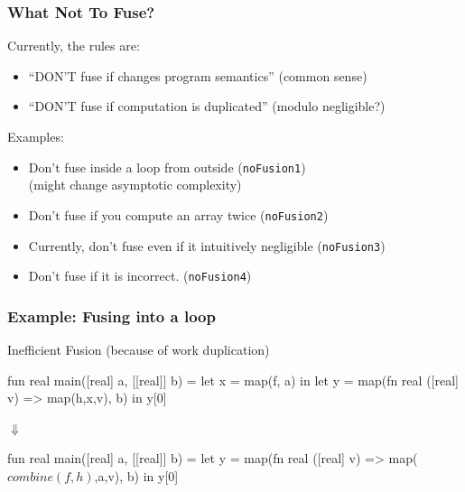 \documentclass{beamer}
\newcommand{\mymath}[1]{$ #1 $}
\begin{document}
\begin{frame}[fragile,t]
  \frametitle{What Not To Fuse?}

  Currently, the rules are:

  \begin{itemize}
  \item ``DON'T fuse if changes program semantics'' (common sense)
  \item ``DON'T fuse if computation is duplicated'' (modulo negligible?)
  \end{itemize}

  \bigskip

  Examples:
  \begin{itemize}
  \item Don't fuse inside a loop from outside (\texttt{noFusion1})\\
    (might change asymptotic complexity) \smallskip

  \item Don't fuse if you compute an array twice (\texttt{noFusion2})\smallskip

  \item Currently, don't fuse even if it intuitively negligible (\texttt{noFusion3})\smallskip

  \item Don't fuse if it is incorrect. (\texttt{noFusion4})
  \end{itemize}

\end{frame}

\begin{frame}[fragile,t]
  \frametitle{Example: Fusing into a loop}

  \begin{block}{Inefficient Fusion (because of work duplication)}
\begin{center}
      \begin{colorcode}[fontsize=\scriptsize]
fun real main([real] a, [[real]] b) =
let x      = map(f, a)                 in
let y      = map(fn real ([real] v) =>
                 map(h,x,v), b)        in
y[0]
      \end{colorcode}
$\Downarrow$
      \begin{colorcode}[fontsize=\scriptsize]
fun real main([real] a, [[real]] b) =
let y      = map(fn real ([real] v) =>
                 map(\mymath{combine(f,h)},a,v), b) in
y[0]
      \end{colorcode}
\end{center}
  \end{block}
\end{frame}
\end{document}
